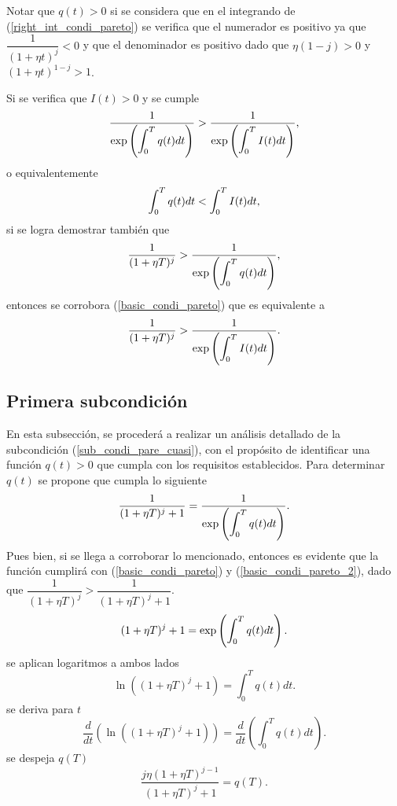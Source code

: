 Notar que $q(t)>0$ si se considera que en el integrando de (\ref{right_int_condi_pareto}) se verifica que el numerador es positivo ya que $\dfrac{1}{(1+\eta t)^j}<0$ y que el denominador es positivo dado que $\eta(1-j)>0$ y $(1+\eta t)^{1-j}>1$.

Si se verifica que $I(t)>0$ y se cumple
$$ \dfrac{1}{\exp\left(\displaystyle \int_0^{T}q(t)dt\right)} >   \dfrac{1}{\exp\left(\displaystyle \int_0^{T}I(t)dt\right)},$$
o equivalentemente
\begin{equation}
    \label{sub_condi_pare_cuasi}
\displaystyle \int_0^{T}q(t)dt <  \displaystyle \int_0^{T}I(t)dt, 
\end{equation}
%
si se logra demostrar también que 
\begin{equation}
\label{sub_condi_pare_cuasi2}
    \dfrac{1}{(1+\eta T)^j} >   \dfrac{1}{\exp\left(\displaystyle \int_0^{T}q(t)dt\right)}, 
\end{equation}
%
entonces se corrobora (\ref{basic_condi_pareto}) que es equivalente a
\begin{equation}
\label{basic_condi_pareto_2}
    \dfrac{1}{(1+\eta T)^j} >  \dfrac{1}{\exp\left(\displaystyle \int_0^{T}I(t)dt\right)}.
\end{equation}

\subsection{Primera subcondición}
En esta subsección, se procederá a realizar un análisis detallado de la subcondición (\ref{sub_condi_pare_cuasi}), con el propósito de identificar una función $q(t)>0$ que cumpla con los requisitos establecidos.
Para determinar $q(t)$ se propone que cumpla lo siguiente
\begin{equation*}
    \dfrac{1}{(1+\eta T)^j+1} =  \dfrac{1}{\exp\left(\displaystyle \int_0^{T}q(t)dt\right)}.
\end{equation*}
Pues bien, si se llega a corroborar lo mencionado, entonces es evidente que la función cumplirá con (\ref{basic_condi_pareto}) y (\ref{basic_condi_pareto_2}), dado que $\dfrac{1}{(1+\eta T)^j} > \dfrac{1}{(1+\eta T)^j+1}$.
%
\begin{equation}
\label{q_de_t_expo_integral}
    (1+\eta T)^j+1 =  \exp\left(\displaystyle \int_0^{T}q(t)dt\right).
\end{equation}
se aplican logaritmos a ambos lados
\begin{equation*}
    \ln \left((1+\eta T)^j+1\right) =   \int_0^{T}q(t)dt.
\end{equation*}
se deriva para $t$
\begin{equation*}
    \dfrac{d}{dt} \left(\ln \left((1+\eta T)^j+1\right)\right) =   \dfrac{d}{dt} \left(\int_0^{T}q(t)dt\right).
\end{equation*}
se despeja $q(T)$
\begin{equation}
\label{q_de_T}
    \dfrac{j\eta(1+\eta T)^{j-1}}{(1+\eta T)^j+1} =   q(T).
\end{equation}

